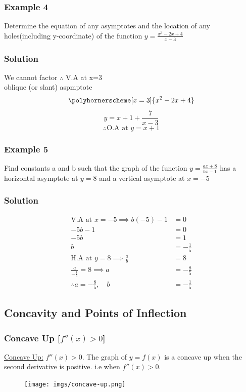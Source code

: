 \documentclass{article}
\begin{document}
\subsubsection{Example 4}
Determine the equation of any asymptotes and the location of any holes(including y-coordinate) of the function $y=\frac{x^2-2x+4}{x-3}$
\subsubsection*{Solution}
We cannot factor
$\therefore$ V.A at x=3\\
oblique (or slant) aspmptote 
$$\polyhornerscheme[x=3]{x^2-2x+4}$$
$$y=x+1+\frac{7}{x-3}$$
$$\therefore \text{O.A at } y=x+1$$
\subsubsection{Example 5}
Find constants a and b such that the graph of the function $y=\frac{ax+8}{bx-1}$ has a horizontal asymptote at $y=8$ and a vertical asymptote at $x=-5$
\subsubsection*{Solution}
\begin{align*}
    \text{V.A at } x=-5 \implies b(-5)-1&=0\\
    -5b-1&=0\\
    -5b&=1\\
    b&=-\frac{1}{5}\\
    \text{H.A at } y=8 \implies \frac{a}{b}&=8\\
    \frac{a}{-\frac{1}{5}}=8 \implies a &=-\frac{8}{5}\\
    \therefore a=-\frac{8}{5}, \quad b&=-\frac{1}{5}
\end{align*}
\newpage
\subsection{Concavity and Points of Inflection}
\subsubsection{Concave Up [$f''(x)>0$]}
\underline{Concave Up:} $f''(x)>0$. The graph of $y=f(x)$ is a concave up when the second derivative is positive. i.e when $f''(x)>0$.
\begin{figure}[ht]
    \centering
    \texttt{[image: imgs/concave-up.png]}
\end{figure}
\end{document}
